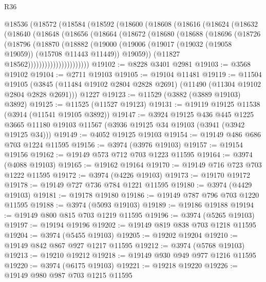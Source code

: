 \begin{lexlean}{R36}
\begin{coremodule}
    @18536
      (@18572
        (@18584
          (@18592
            (@18600
              (@18608
                (@18616
                  (@18624
                    (@18632
                      (@18640
                        (@18648
                          (@18656
                            (@18664
                              (@18672
                                (@18680
                                  (@18688
                                    (@18696
                                      (@18726
                                        (@18796
                                          (@18870
                                            (@18882
                                              (@19000
                                                (@19006
                                                  (@19017
                                                    (@19032 (@19058 @19059))
                                                    (@15708 @11443 @11449))
                                                  @19059))
                                              (@11827 @18562))))))))))))))))))))))
@19102 := @8228 @3401 @2981
@19103 := @3568 @19102
@19104 := @2711 @19103
@19105 := @19104 @11481
@19119 := @11504
    @19105
    (@3845 (@11484 @19102 @2804 @2828 @2691) (@11490 (@11304 @19102 @2804 @2828 @2691)))
    @1227
@19123 := @11529 (@3882 (@3889 @19103) @3892)
@19125 := @11525 (@11527 @19123)
@19131 := @19119 @19125 @11538 (@3914 (@11541 @19105 @3892))
@19147 := @3924
    @19125
    @436
    @445
    @1225
    @3665
    @11180
    @19103
    @11567
    (@3936 @19125 @34 @19103 (@3941 (@3942 @19125 @34)))
@19149 := @4052 @19125 @19103
@19154 := @19149 @486 @686 @703 @1224 @11595
@19156 := @3974 (@3976 @19103)
@19157 := @19154 @19156
@19162 := @19149 @573 @712 @703 @1223 @11595
@19164 := @3974 (@4088 @19103)
@19165 := @19162 @19164
@19170 := @19149 @716 @723 @703 @1222 @11595
@19172 := @3974 (@4226 @19103)
@19173 := @19170 @19172
@19178 := @19149 @727 @736 @784 @1221 @11595
@19180 := @3974 (@4429 @19103)
@19181 := @19178 @19180
@19186 := @19149 @787 @796 @703 @1220 @11595
@19188 := @3974 (@5093 @19103)
@19189 := @19186 @19188
@19194 := @19149 @800 @815 @703 @1219 @11595
@19196 := @3974 (@5265 @19103)
@19197 := @19194 @19196
@19202 := @19149 @819 @838 @703 @1218 @11595
@19204 := @3974 (@5455 @19103)
@19205 := @19202 @19204
@19210 := @19149 @842 @867 @927 @1217 @11595
@19212 := @3974 (@5768 @19103)
@19213 := @19210 @19212
@19218 := @19149 @930 @949 @977 @1216 @11595
@19220 := @3974 (@6175 @19103)
@19221 := @19218 @19220
@19226 := @19149 @980 @987 @703 @1215 @11595

\end{coremodule}
\end{lexlean}
